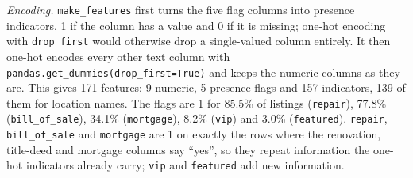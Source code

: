 \documentclass[10pt,twocolumn,a4paper]{article}
\begin{document}
\textit{Encoding.} \texttt{make\_features} first turns the five flag
columns into presence indicators, 1 if the column has a value and 0 if
it is missing; one-hot encoding with \texttt{drop\_first} would otherwise
drop a single-valued column entirely. %
It then one-hot encodes every other text column with
\texttt{pandas.get\_dummies(drop\_first=True)} and keeps the numeric
columns as they are. %
This gives 171 features: %
9 numeric, %
5 presence flags %
and 157 indicators, %
139 of them for location names. %
The flags are 1 for 85.5\% of listings (\texttt{repair}), %
77.8\% (\texttt{bill\_of\_sale}), %
34.1\% (\texttt{mortgage}), %
8.2\% (\texttt{vip}) %
and 3.0\% (\texttt{featured}). %
\texttt{repair}, \texttt{bill\_of\_sale} and \texttt{mortgage} are 1
on exactly the rows where the renovation, title-deed and mortgage columns
say ``yes'', %
so they repeat information the one-hot indicators already carry;
\texttt{vip} and \texttt{featured} add new information.
\end{document}
